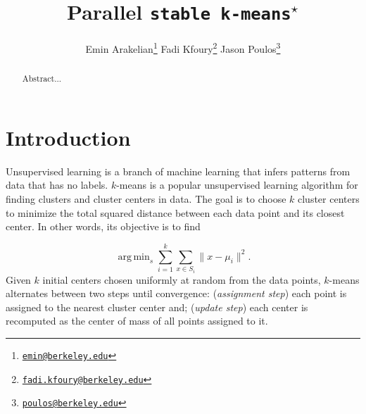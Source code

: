 \documentclass[10pt,twocolumn,letterpaper]{article}
\DeclareMathOperator*{\argmin}{arg\,min}
\begin{document}
\title{Parallel \texttt{stable k-means}$^\star$}

\author{
    Emin Arakelian\thanks{\href{mailto:emin@berkeley.edu}{\nolinkurl{emin@berkeley.edu}}}
    \hspace{10mm}
    Fadi Kfoury\thanks{\href{mailto:fadi.kfoury@berkeley.edu}{\nolinkurl{fadi.kfoury@berkeley.edu}}}
    \hspace{10mm}
     Jason Poulos\thanks{\href{mailto:poulos@berkeley.edu}{\nolinkurl{poulos@berkeley.edu}}}
    \vspace{15mm}
}

\maketitle

\begin{abstract}
Abstract...
\end{abstract}



\section{Introduction} \label{section:Intro}

Unsupervised learning is a branch of machine learning that infers patterns from data that has no labels. $k$-means is a popular unsupervised learning algorithm for finding clusters and cluster centers in data. The goal is to choose $k$ cluster centers to minimize the total squared distance between each data point and its closest center. In other words, its objective is to find

\[
\argmin_s \sum_{i=1}^{k}\sum_{x \in S_i}\parallel x - \mu_i \parallel^2.
\] Given $k$ initial centers chosen uniformly at random from the data points, $k$-means alternates between two steps until convergence: (\textit{assignment step}) each point is assigned to the nearest cluster center and; (\textit{update step}) each center is recomputed as the center of mass of all points assigned to it.
\end{document}
